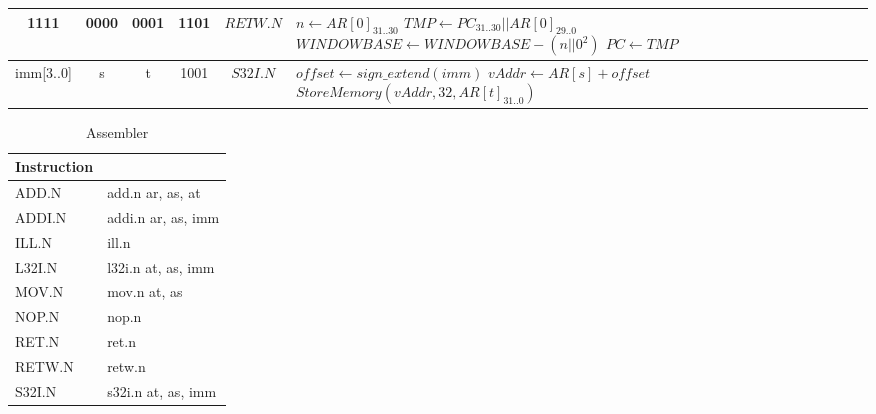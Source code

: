 \begin{smalltables}
\begin{longtable}{llllllllllllllll  p{1cm}  p{7cm} | }
	\multicolumn{4}{|c|}{1111} & \multicolumn{4}{c|}{0000} & \multicolumn{4}{c|}{0001} & \multicolumn{4}{c|}{1101} & \multicolumn{1}{c|}{$RETW.N$} &  $n \leftarrow AR[0]_{31..30}$ \newline $TMP \leftarrow PC_{31..30}||AR[0]_{29..0}$ \newline $WINDOWBASE \leftarrow WINDOWBASE - (n||0^2)$ \newline $PC \leftarrow TMP$ \\ \hline
	\multicolumn{4}{|c|}{imm[3..0]} & \multicolumn{4}{c|}{s} & \multicolumn{4}{c|}{t} & \multicolumn{4}{c|}{1001} & \multicolumn{1}{c|}{$S32I.N$} & $offset \leftarrow sign\_extend(imm)$ \newline $vAddr \leftarrow AR[s] + offset$ \newline $StoreMemory(vAddr, 32, AR[t]_{31..0})$\\ \hline
\end{longtable}

\begin{longtable}{|p{5cm}|p{5cm}|}
	\caption{Assembler\label{long}}\\
	\hline
	Instruction & \\
	\hline
	ADD.N & add.n ar, as, at\\ \hline
	ADDI.N & addi.n ar, as, imm\\ \hline
	ILL.N & ill.n\\ \hline
	L32I.N & l32i.n at, as, imm\\ \hline
	MOV.N & mov.n at, as\\ \hline
	NOP.N & nop.n\\ \hline
	RET.N & ret.n\\ \hline
	RETW.N & retw.n\\ \hline
	S32I.N & s32i.n at, as, imm\\ \hline
\end{longtable}
\end{smalltables}

